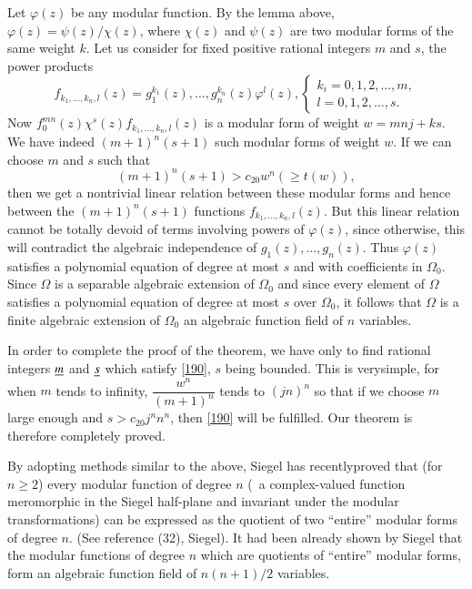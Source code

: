 Let $\varphi(z)$ be any modular function. By the lemma above,
$\varphi(z)=\psi(z)/\chi(z)$, where $\chi(z)$ and $\psi(z)$ are two
modular forms of the same weight $k$. Let us consider for fixed
positive rational integers $m$ and $s$, the power products
$$
f_{k_{1},\ldots,k_{n},l}(z)=g^{k_{1}}_{1}(z),\ldots,g^{k_{n}}_{n}(z)\varphi^{l}(z),
\begin{cases}
k_{i}=0,1,2,\ldots,m,\\
l=0,1,2,\ldots,s.
\end{cases}
$$
Now $f_{0}^{mn}(z)\chi^{s}(z)f_{k_{1},\ldots,k_{n},l}(z)$ is a modular
  form of weight $w=mnj+ks$. We have indeed $(m+1)^{n}(s+1)$ such
  modular forms of weight $w$. If we can choose $m$ and $s$ such that
\begin{equation*}
(m+1)^{n}(s+1)>c_{20}w^{n}(\geq t(w)),\tag{190}\label{190}
\end{equation*}
then we get a nontrivial linear relation between these modular forms
and hence between the $(m+1)^{n}(s+1)$ functions
$f_{k_{1},\ldots,k_{n},l}(z)$. But this linear relation cannot be
totally devoid of terms involving powers of $\varphi(z)$, since
otherwise, this will contradict the algebraic independence of
$g_{1}(z),\ldots,g_{n}(z)$. Thus $\varphi(z)$ satisfies a polynomial
equation of degree at most $s$ and with coefficients in
$\Omega_{0}$. Since $\Omega$ is a separable algebraic extension of
$\Omega_{0}$ and since every element of $\Omega$ satisfies a
polynomial equation of degree at most $s$ over $\Omega_{0}$, it
follows that $\Omega$ is a finite algebraic extension of $\Omega_{0}$
\ie an algebraic function field of $n$ variables.

In order to complete the proof of the theorem, we have only to find
rational integers $\underline{m}$ and $\underline{s}$ which satisfy \eqref{190}, $s$
being bounded. This is very\pageoriginale simple, for when $m$ tends
to infinity, $\dfrac{w^{n}}{(m+1)^{n}}$ tends to $(jn)^{n}$ so that if
we choose $m$ large enough and $s>c_{20}j^{n}n^{n}$, then \eqref{190}
will be fulfilled. Our theorem is therefore completely proved.

By adopting methods similar to the above, Siegel has recently\break proved
that (for $n\geq 2$) every modular function of degree $n$ (\ie\ a
complex-valued function meromorphic in the Siegel half-plane and
invariant under the modular transformations) can be expressed as the
quotient of two ``entire'' modular forms of degree $n$. (See reference
(32), Siegel). It had been already shown by Siegel that the modular
functions of degree $n$ which are quotients of ``entire'' modular
forms, form an algebraic function field of $n(n+1)/2$ variables.


